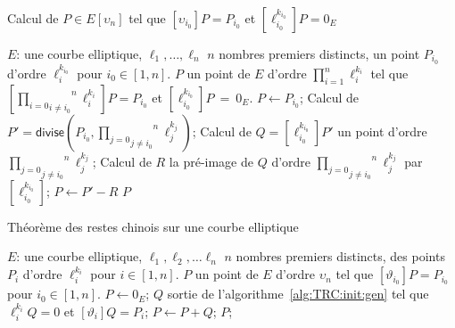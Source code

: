 \documentclass[10pt,a4paper]{book}
\theoremstyle{plain}
\theoremstyle{definition}
\theoremstyle{definition}
\theoremstyle{definition}
\theoremstyle{definition}
\theoremstyle{definition}
\theoremstyle{remark}
\theoremstyle{remark}
\theoremstyle{definition}
\begin{document}
\begin{algorithm}
\caption{ \label{alg:TRC:init:gen}  Calcul de $P \in E[\upsilon_n]$ tel que 
$[\upsilon_{i_0}]P=P_{i_0}$ 
et $[\ell_{i_0}^{k_{i_0}}]P=0_E$}
\begin{algorithmic}[1]
\REQUIRE $E$: une courbe elliptique, $\ell_1, \dots, \ell_n$ $n$ nombres premiers distincts, un point $P_{i_0}$ d'ordre $\ell_i^{k_{i_0}}$ pour $i_0 \in [1,n]$.
\ENSURE $P$ un point de $E$ d'ordre $\prod_{i=1}^n \ell_i^{k_i}$  tel que $[\overset{n}{\underset{i \neq i_0}{\underset{i = 0}{\prod}}}\ell_i^{k_i} ]P=P_{i_0}$ et $[\ell_{i_0}^{k_{i_0}}]P~=~0_E$.
\STATE $P \leftarrow P_{i_0}$;
\STATE \label{alg:TRC:init:gen:div} Calcul de $P'=\mathsf{divise}(P_{i_0},\overset{n}{\underset{j \neq i_0}{\underset{j = 0}{\prod}}}\ell_j^{k_j})$;
\STATE \label{alg:TRC:init:gen:mul} Calcul de $Q=[\ell_{i_0}^{k_{i_0}}]P'$ un point d'ordre $\overset{n}{\underset{j \neq i_0}{\underset{j = 0}{\prod}}}\ell_j^{k_j}$;
\STATE \label{alg:TRC:init:gen:prim} Calcul de $R$ la pré-image de $Q$ d'ordre $\overset{n}{\underset{j \neq i_0}{\underset{j = 0}{\prod}}}\ell_j^{k_j}$ par $[\ell_{i_0}^{k_{i_0}}]$;
\STATE \label{alg:TRC:init:gen:add}$P \leftarrow P'-R$
\RETURN $P$
\end{algorithmic}
\end{algorithm}

\begin{algorithm}
\caption{\label{alg:TRC} Théorème des restes chinois sur une courbe elliptique}
\begin{algorithmic}[1]
\REQUIRE $E$: une courbe elliptique, $\ell_1,\ell_2, \dots \ell_n$ $n$ nombres premiers distincts, des points $P_i$ d'ordre $\ell_i^{k_i}$ pour $i \in [1,n]$.
\ENSURE $P$ un point de $E$ d'ordre $\upsilon_n$  tel que $[\vartheta_{i_0} ] P=P_{i_0}$ pour $i_0 \in [1,n]$.
\STATE $P \leftarrow 0_E$;
\STATE $Q$ sortie de l'algorithme~\ref{alg:TRC:init:gen} tel que $\ell_i^{k_i}Q=0$ et $[\vartheta_i]Q=P_i$;
\STATE $P \leftarrow P+Q$; 
\ENDFOR
\RETURN $P$;
\end{algorithmic}
\end{algorithm}
\newpage
\null
\newpage

\end{document}
